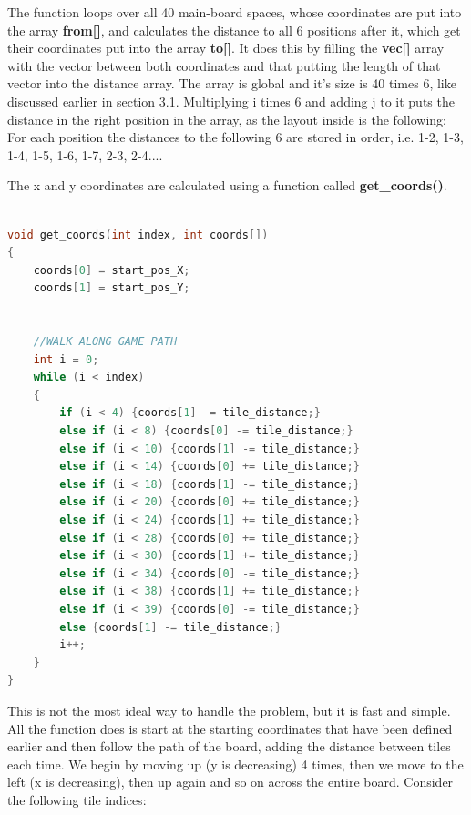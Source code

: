 \documentclass[12pt]{article}
\begin{document}
The function loops over all 40 main-board spaces, whose coordinates are put into the array \textbf{from[]}, and calculates the distance to all 6 positions after it, which get their coordinates put into the array \textbf{to[]}. It does this by filling the \textbf{vec[]} array with the vector between both coordinates and that putting the length of that vector into the distance array. The array is global and it's size is 40 times 6, like discussed earlier in section 3.1. Multiplying i times 6 and adding j to it puts the distance in the right position in the array, as the layout inside is the following:
For each position the distances to the following 6 are stored in order, i.e. 1-2, 1-3, 1-4, 1-5, 1-6, 1-7, 2-3, 2-4....
\linebreak

The x and y coordinates are calculated using a function called \textbf{get\_coords()}.
\linebreak

\begin{lstlisting}[language=C, caption={Distance calculation}, label={lst:distance calculation}]

void get_coords(int index, int coords[])
{
    coords[0] = start_pos_X;
    coords[1] = start_pos_Y;


    //WALK ALONG GAME PATH
    int i = 0;
    while (i < index)
    {    
        if (i < 4) {coords[1] -= tile_distance;}
        else if (i < 8) {coords[0] -= tile_distance;}
        else if (i < 10) {coords[1] -= tile_distance;}
        else if (i < 14) {coords[0] += tile_distance;}
        else if (i < 18) {coords[1] -= tile_distance;}
        else if (i < 20) {coords[0] += tile_distance;}
        else if (i < 24) {coords[1] += tile_distance;}
        else if (i < 28) {coords[0] += tile_distance;}
        else if (i < 30) {coords[1] += tile_distance;}
        else if (i < 34) {coords[0] -= tile_distance;}
        else if (i < 38) {coords[1] += tile_distance;}
        else if (i < 39) {coords[0] -= tile_distance;}
        else {coords[1] -= tile_distance;}
        i++;
    }
}
\end{lstlisting}

This is not the most ideal way to handle the problem, but it is fast and simple. All the function does is start at the starting coordinates that have been defined earlier and then follow the path of the board, adding the distance between tiles each time. We begin by moving up (y is decreasing) 4 times, then we move to the left (x is decreasing), then up again and so on across the entire board.
Consider the following tile indices:
\end{document}
